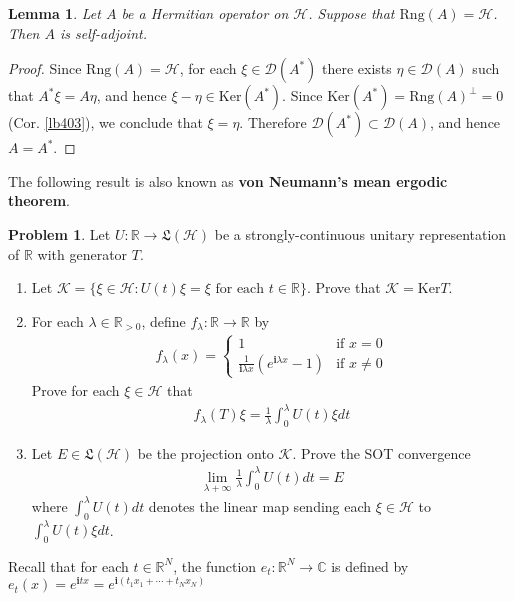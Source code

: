 \documentclass[12pt,b5paper,notitlepage]{article}
\theoremstyle{definition}
\newtheorem{prob}{\color{red}Problem}[section]
\theoremstyle{plain}
\newtheorem{lm}[df]{Lemma}
\newcommand{\fk}{\mathfrak}
\newcommand{\Dom}{\mathscr{D}}
\newcommand{\im}{\mathbf{i}}
\newcommand{\Cbb}{\mathbb C}
\newcommand{\Rbb}{\mathbb R}
\newcommand{\Ker}{\mathrm{Ker}}
\newcommand{\Rng}{\mathrm{Rng}}
\newcommand{\dps}{\displaystyle}
\newcommand{\MH}{\mathcal H}
\newcommand{\MK}{\mathcal K}
\numberwithin{equation}{section}
\begin{document}
\begin{lm}\label{lb486}
Let $A$ be a Hermitian operator on $\MH$. Suppose that $\Rng(A)=\MH$. Then $A$ is self-adjoint.
\end{lm}


\begin{proof}
Since $\Rng(A)=\MH$, for each $\xi\in\Dom(A^*)$ there exists $\eta\in\Dom(A)$ such that $A^*\xi=A\eta$, and hence $\xi-\eta\in\Ker(A^*)$. Since $\Ker(A^*)=\Rng(A)^\perp=0$ (Cor. \ref{lb403}), we conclude that $\xi=\eta$. Therefore $\Dom(A^*)\subset\Dom(A)$, and hence $A=A^*$.
\end{proof}




The following result is also known as  \textbf{von Neumann's mean ergodic theorem}. 

\begin{prob}
Let $U:\Rbb\rightarrow\fk L(\MH)$ be a strongly-continuous unitary representation of $\Rbb$ with generator $T$.
\begin{enumerate}
\item Let $\MK=\{\xi\in\MH:U(t)\xi=\xi\text{ for each }t\in\Rbb\}$. Prove that $\MK=\Ker T$.
\item For each $\lambda\in\Rbb_{>0}$, define $f_\lambda:\Rbb\rightarrow\Rbb$ by
\begin{align*}
f_\lambda(x)=\left\{
\begin{array}{ll}
1&\text{if }x=0\\[0.5ex]
\dps\frac 1{\im\lambda x}(e^{\im \lambda x}-1)&\text{if }x\neq0
\end{array}
\right.
\end{align*}
Prove for each $\xi\in\MH$ that
\begin{align*}
f_\lambda(T)\xi=\frac 1\lambda\int_0^\lambda U(t)\xi dt
\end{align*}
\item Let $E\in\fk L(\MH)$ be the projection onto $\MK$. Prove the SOT convergence
\begin{align*}
\lim_{\lambda+\infty}\frac 1\lambda\int_0^\lambda U(t) dt=E
\end{align*}
where $\int_0^\lambda U(t) dt$ denotes the linear map sending each $\xi\in\MH$ to $\int_0^\lambda U(t)\xi dt$.
\end{enumerate}
\end{prob}




Recall that for each $t\in\Rbb^N$, the function $e_t:\Rbb^N\rightarrow\Cbb$ is defined by $e_t(x)=e^{\im tx}=e^{\im(t_1x_1+\cdots+t_Nx_N)}$
\end{document}
